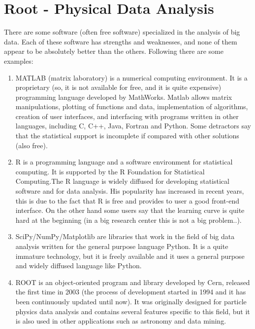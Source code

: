 \section{Root - Physical Data Analysis }

There are some software (often free software) specialized in the analysis of big data. Each of these software has strengths and weaknesses, and none of them appear to be absolutely better than the others. Following there are some examples:
 
\begin{enumerate}

\item MATLAB (matrix laboratory) is a numerical computing environment. It is a proprietary (so, it is not available for free, and it is quite expensive) programming language developed by MathWorks. Matlab allows matrix manipulations, plotting of functions and data, implementation of algorithms, creation of user interfaces, and interfacing with programs written in other languages, including C, C++, Java, Fortran and Python. 
Some detractors say that the statistical support is incomplete if compared with other solutions (also free).

\item R is a programming language and a software environment for statistical computing. It is supported by the R Foundation for Statistical Computing.The R language is widely diffused for developing statistical software and for data analysis. His popularity has increased in recent years, this is due to the fact that R is free and provides to user a good front-end interface. On the other hand some users say that the learning curve is quite hard at the beginning (in a big research center this is not a big problem..).  

\item SciPy/NumPy/Matplotlib are libraries that work in the field of big data analysis written for the general purpose language Python. It is a quite immature technology, but it is freely available and it uses a general purpose and widely diffused language like Python.

\item ROOT is an object-oriented program and library developed by Cern, released the first time in 2003 (the process of development started in 1994 and it has been continuously updated until now). It was originally designed for particle physics data analysis and contains several features specific to this field, but it is also used in other applications such as astronomy and data mining. 

\end{enumerate}

